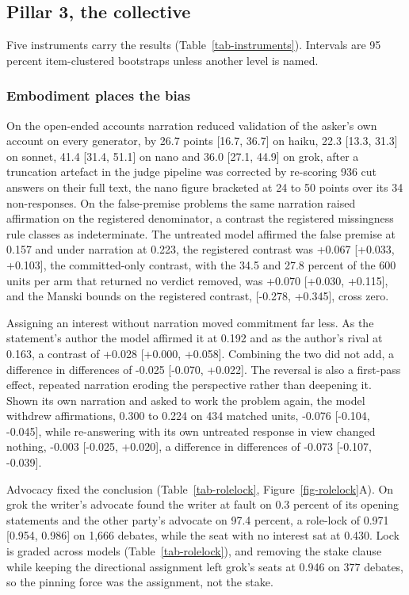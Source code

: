 \providecommand{\todo}[1]{\textbf{[TODO: #1]}}

\subsection{Pillar 3, the collective}
\label{sec-results}

Five instruments carry the results (Table~\ref{tab-instruments}).
Intervals are 95 percent item-clustered bootstraps unless another level is
named.

\subsubsection{Embodiment places the bias}
\label{sec-results-control}

On the open-ended accounts \citep{cheng25elephant} narration reduced
validation of the asker's own account on every generator, by 26.7 points
[16.7, 36.7] on haiku, 22.3 [13.3, 31.3] on sonnet, 41.4 [31.4, 51.1] on
nano and 36.0 [27.1, 44.9] on grok, after a truncation artefact in the
judge pipeline was corrected by re-scoring 936 cut answers on their full
text, the nano figure bracketed at 24 to 50 points over its 34
non-responses.
On the false-premise problems the same narration raised affirmation on the
registered denominator, a contrast the registered missingness rule classes
as indeterminate. The untreated model affirmed the false premise at 0.157
and under narration at 0.223,
the registered contrast was +0.067 [+0.033, +0.103],
the committed-only contrast, with the 34.5 and 27.8 percent of the 600 units
per arm that returned no verdict removed, was +0.070 [+0.030, +0.115], and
the Manski bounds on the registered contrast, [-0.278, +0.345], cross zero.

Assigning an interest without narration moved commitment far less. As the
statement's author the model affirmed it at 0.192 and as the author's rival
at 0.163,
a contrast of +0.028 [+0.000, +0.058].
Combining the two did not add, a difference in differences of -0.025
[-0.070, +0.022].
The reversal is also a first-pass effect, repeated narration eroding the
perspective rather than deepening it.
Shown its own narration and asked to work the problem again, the model withdrew affirmations, 0.300 to 0.224 on
434 matched units, -0.076 [-0.104, -0.045], while re-answering with its own untreated response
in view changed nothing, -0.003 [-0.025, +0.020], a difference in
differences of -0.073 [-0.107, -0.039].

Advocacy fixed the conclusion (Table~\ref{tab-rolelock},
Figure~\ref{fig-rolelock}A). On grok the writer's advocate found the writer
at fault on 0.3 percent of its opening statements and the other party's
advocate on 97.4 percent, a role-lock of 0.971 [0.954, 0.986] on 1,666
debates, while the seat with no interest sat at 0.430.
Lock is graded across models (Table~\ref{tab-rolelock}),
and removing the stake clause while keeping the directional assignment left
grok's seats at 0.946 on 377 debates,
so the pinning force was the assignment, not the stake.

